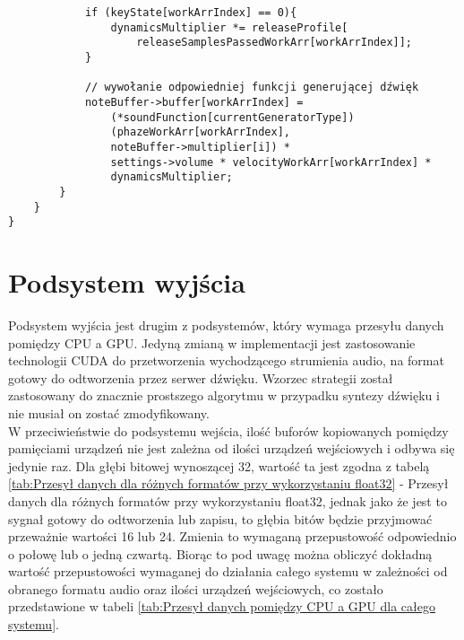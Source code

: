\begin{lstlisting}
            if (keyState[workArrIndex] == 0){
                dynamicsMultiplier *= releaseProfile[
                    releaseSamplesPassedWorkArr[workArrIndex]];
            }

            // wywołanie odpowiedniej funkcji generującej dźwięk
            noteBuffer->buffer[workArrIndex] = 
                (*soundFunction[currentGeneratorType])
                (phazeWorkArr[workArrIndex],
                noteBuffer->multiplier[i]) *
                settings->volume * velocityWorkArr[workArrIndex] *
                dynamicsMultiplier;
        }
    }
}
\end{lstlisting}


\section{Podsystem wyjścia}

Podsystem wyjścia jest drugim z podsystemów, który wymaga przesyłu danych pomiędzy CPU a GPU. Jedyną zmianą w implementacji jest zastosowanie technologii CUDA do przetworzenia wychodzącego strumienia audio, na format gotowy do odtworzenia przez serwer dźwięku. Wzorzec strategii został zastosowany do znacznie prostszego algorytmu w przypadku syntezy dźwięku i nie musiał on zostać zmodyfikowany. 
\\
W przeciwieństwie do podsystemu wejścia, ilość buforów kopiowanych pomiędzy pamięciami urządzeń nie jest zależna od ilości urządzeń wejściowych i odbywa się jedynie raz. Dla głębi bitowej wynoszącej 32, wartość ta jest zgodna z tabelą \ref{tab:Przesył danych dla różnych formatów przy wykorzystaniu float32} - Przesył danych dla różnych formatów przy wykorzystaniu float32, jednak jako że jest to sygnał gotowy do odtworzenia lub zapisu, to głębia bitów będzie przyjmować przeważnie wartości 16 lub 24. Zmienia to wymaganą przepustowość odpowiednio o połowę lub o jedną czwartą. Biorąc to pod uwagę można obliczyć dokładną wartość przepustowości wymaganej do działania całego systemu w zależności od obranego formatu audio oraz ilości urządzeń wejściowych, co zostało przedstawione w tabeli \ref{tab:Przesył danych pomiędzy CPU a GPU dla całego systemu}.

